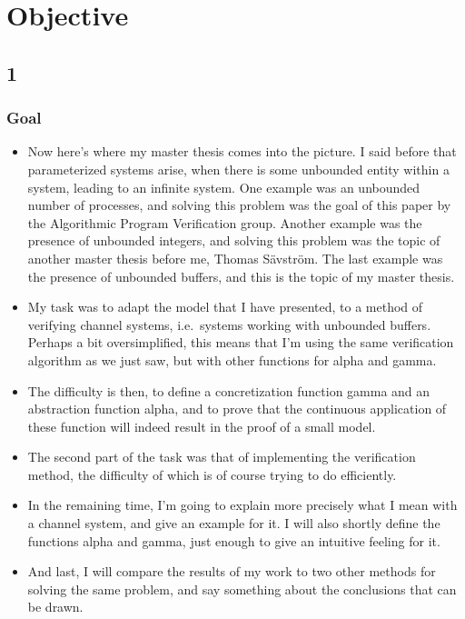 \documentclass[handout]{beamer}
\begin{document}
\begin{footnotesize}
\begin{frame}
\end{frame}

\section{Objective}
\subsection*{1}
\begin{frame}
  \frametitle{Goal}
  \begin{itemize}
    \item
Now here's where my master thesis comes into the picture. I said before that parameterized systems arise, when there is some unbounded entity within a system, leading to an infinite system. One example was an unbounded number of processes, and solving this problem was the goal of this paper by the Algorithmic Program Verification group. Another example was the presence of unbounded integers, and solving this problem was the topic of another master thesis before me, Thomas Sävström. The last example was the presence of unbounded buffers, and this is the topic of my master thesis.
\item
My task was to adapt the model that I have presented, to a method of verifying channel systems, i.e.\ systems working with unbounded buffers. Perhaps a bit oversimplified, this means that I'm using the same verification algorithm as we just saw, but with other functions for alpha and gamma.
\item
The difficulty is then, to define a concretization function gamma and an abstraction function alpha, and to prove that the continuous application of these function will indeed result in the proof of a small model.
\item
The second part of the task was that of implementing the verification method, the difficulty of which is of course trying to do efficiently.
  \end{itemize}
\end{frame}

\begin{frame}
\begin{itemize}
\item
In the remaining time, I'm going to explain more precisely what I mean with a channel system, and give an example for it. I will also shortly define the functions alpha and gamma, just enough to give an intuitive feeling for it.

\item
And last, I will compare the results of my work to two other methods for solving the same problem, and say something about the conclusions that can be drawn.
\end{itemize}
\end{frame}



\end{footnotesize}
\end{document}
